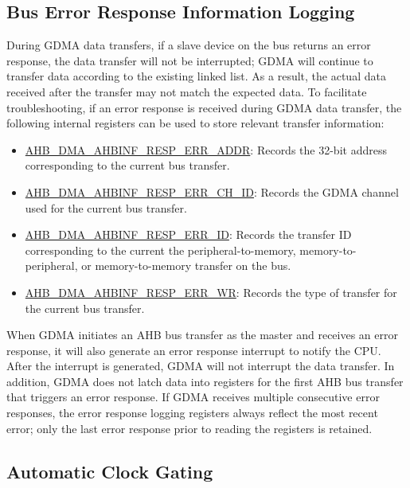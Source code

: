 \documentclass[main\_\_EN.tex]{subfiles}
\begin{document}
\subsection{Bus Error Response Information Logging}\label{sec:dma-bus-error-resp}

During GDMA data transfers, if a slave device on the bus returns an error response, the data transfer will not be interrupted; GDMA will continue to transfer data according to the existing linked list. As a result, the actual data received after the transfer may not match the expected data. To facilitate troubleshooting, if an error response is received during GDMA data transfer, the following internal registers can be used to store relevant transfer information:

\begin{itemize}
    \item \hyperref[fielddesc:AHBDMAAHBINFRESPERRADDR]{AHB\_DMA\_AHBINF\_RESP\_ERR\_ADDR}: Records the 32-bit address corresponding to the current bus transfer.
    \item \hyperref[fielddesc:AHBDMAAHBINFRESPERRCHID]{AHB\_DMA\_AHBINF\_RESP\_ERR\_CH\_ID}: Records the GDMA channel used for the current bus transfer.
    \item \hyperref[fielddesc:AHBDMAAHBINFRESPERRID]{AHB\_DMA\_AHBINF\_RESP\_ERR\_ID}: Records the transfer ID corresponding to the current the peripheral-to-memory, memory-to-peripheral, or memory-to-memory transfer on the bus.
    \item \hyperref[fielddesc:AHBDMAAHBINFRESPERRWR]{AHB\_DMA\_AHBINF\_RESP\_ERR\_WR}: Records the type of transfer for the current bus transfer.
\end{itemize}

When GDMA initiates an AHB bus transfer as the master and receives an error response, it will also generate an error response interrupt to notify the CPU. After the interrupt is generated, GDMA will not interrupt the data transfer. In addition, GDMA does not latch data into registers for the first AHB bus transfer that triggers an error response. If GDMA receives multiple consecutive error responses, the error response logging registers always reflect the most recent error; only the last error response prior to reading the registers is retained.

\subsection{Automatic Clock Gating}\label{sec:dma-auto-clk-gating}
\end{document}
